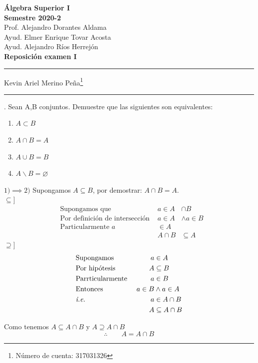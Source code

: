 \documentclass[letterpaper]{article}
\renewcommand{\*}{\cdot}
\theoremstyle{definition}
\begin{document}
\begin{center}
	\vspace{-114pt}
	\textbf{\large Álgebra Superior I}\\
	\textbf{ Semestre 2020-2}\\
	Prof. Alejandro Dorantes Aldama\\
	Ayud. Elmer Enrique Tovar Acosta \\
	Ayud. Alejandro Ríos Herrejón \\
	\textbf{Reposición examen I}
\rule{19cm}{0.2mm}
	\vspace{-0.7cm}
	\begin{center}
Kevin Ariel Merino Peña\footnote[2]{Número de cuenta: 317031326}
	\end{center}
	\vspace{-0.5cm}
\rule{19cm}{0.2mm}
\end{center}
. Sean A,B conjuntos. Demuestre que las siguientes son equivalentes:
\begin{enumerate}
	\item $ A \subset B $
	\item $ A \cap B = A $
	\item $ A \cup B = B $
	\item $ A \backslash B = \varnothing $
\end{enumerate}
$ 1) \implies 2) $ Supongamos $ A \subseteq B $, por demostrar: $ A \cap B = A $.
\\ $\subseteq]  $
\begin{align*}
	&\text{Supongamos que } & a \in A&\cap B  \\
	&\text{Por definición de intersección } & a \in A &\land a \in  B \\
	&\text{Particularmente } a &\in A \\
	& &  A \cap B &\subseteq A 
\end{align*}
$\supseteq]  $
\begin{align*}
	&\text{Supongamos } & a &\in A\\
	&\text{Por hipótesis } & A &\subseteq B \\
	&\text{Parrticularmente } & a &\in B \\
	&\text{Entonces } & a \in B & \land a \in A\\
	&\text{\textit{i.e.} } & a &\in A \cap B \\
	&\text{ } & A &\subseteq A \cap B 
\end{align*}
\begin{center}
	Como tenemos $ A \subseteq A \cap B  $ y $ A \supseteq A \cap B  $
	$$ \therefore \qquad A = A \cap B  $$
\end{center}
\end{document}
